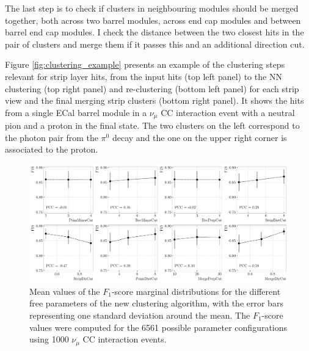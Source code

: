 The last step is to check if clusters in neighbouring modules should be merged together, both across two barrel modules, across end cap modules and between barrel end cap modules. I check the distance between the two closest hits in the pair of clusters and merge them if it passes this and an additional direction cut.

Figure \ref{fig:clustering_example} presents an example of the clustering steps relevant for strip layer hits, from the input hits (top left panel) to the NN clustering (top right panel) and re-clustering (bottom left panel) for each strip view and the final merging strip clusters (bottom right panel). It shows the hits from a single ECal barrel module in a $\nu_{\mu}$ CC interaction event with a neutral pion and a proton in the final state. The two clusters on the left correspond to the photon pair from the $\pi^{0}$ decay and the one on the upper right corner is associated to the proton.

\begin{figure}[t]
	\centering
	\includegraphics[width=.99\linewidth]{Images/GArSoft_PID/Neutral/coolcluster_optimisation_F1S.pdf}
	\caption{Mean values of the $F_{1}$-score marginal distributions for the different free parameters of the new clustering algorithm, with the error bars representing one standard deviation around the mean. The $F_{1}$-score values were computed for the 6561 possible parameter configurations using 1000 $\nu_{\mu}$ CC interaction events.}
	\label{fig:clustering_optimisation}
\end{figure}

